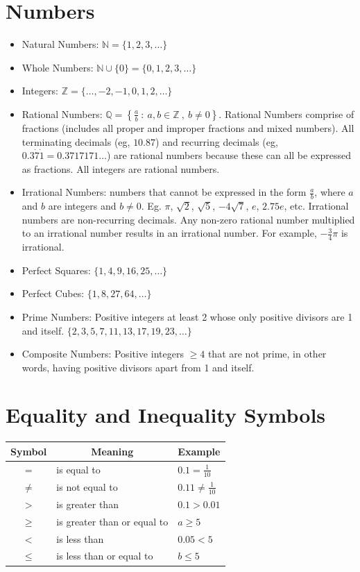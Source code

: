 \documentclass[twocolumn]{article}
\begin{document}
\section*{Numbers}

\begin{itemize}
\item Natural Numbers: $\mathbb{N} = \{1,2,3, \ldots\}$
\item Whole Numbers: $\mathbb{N} \cup \{0\} =\{0,1,2,3, \ldots\}$
\item Integers: $\mathbb{Z} =\{\ldots,-2,-1,0,1,2, \ldots\}$
\item Rational Numbers: $\mathbb{Q} = \left\{\frac{a}{b} \ : \  a, b \in \mathbb{Z} \ , \ b \neq 0 \right\}$. Rational Numbers comprise of fractions (includes all proper and improper fractions and mixed numbers). All terminating decimals (eg, $10.87$) and recurring decimals (eg, $0.3\dot{7}\dot{1} = 0.3717171\ldots$) are rational numbers because these can all be expressed as fractions. All integers are rational numbers.
\item Irrational Numbers: numbers that cannot be expressed in the form $\frac{a}{b}$, where $a$ and $b$ are integers and $b \neq 0$. Eg. $\pi$, $\sqrt{2}$, $\sqrt{5}$, $-4\sqrt{7}$, $e$, $2.75e$, etc. Irrational numbers are non-recurring decimals. Any non-zero rational number multiplied to an irrational number results in an irrational number. For example, $-\frac{3}{4}\pi$ is irrational.
\item Perfect Squares: $\{1,4,9,16,25, \ldots\}$
\item Perfect Cubes: $\{1,8,27,64, \ldots\}$
\item Prime Numbers: Positive integers at least 2 whose only positive divisors are 1 and itself. $\{2,3,5,7,11,13,17,19,23, \ldots\}$
\item Composite Numbers: Positive integers $\geq 4$ that are not prime, in other words, having positive divisors apart from 1 and itself.
\end{itemize}

\section*{Equality and Inequality Symbols}

\begin{tabular}{|c|l|l|}
	\hline Symbol & \multicolumn{1}{|c|}{ Meaning } & \multicolumn{1}{|c|}{ Example } \\
	\hline$=$ & is equal to & $0.1=\frac{1}{10}$ \\
	\hline$\neq$ & is not equal to & $0.11 \neq \frac{1}{10}$ \\
	\hline$>$ & is greater than & $0.1>0.01$ \\
	\hline$\geqslant$ & is greater than or equal to & $a \geqslant 5$ \\
	\hline$<$ & is less than & $0.05<5$ \\
	\hline$\leqslant$ & is less than or equal to & $b \leqslant 5$ \\
	\hline
\end{tabular}
\end{document}
